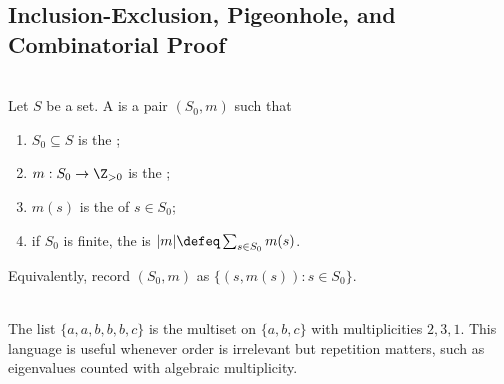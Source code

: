 \subsection{Inclusion-Exclusion, Pigeonhole, and Combinatorial Proof}

\begin{definition} \label{def:multisets-and-multiplicity} \\
Let $S$ be a set. A  is a pair $(S_0,m)$ such that
\begin{enumerate}[label=(\roman*)]
\setlength{\itemsep}{0pt}
\item $S_0\subseteq S$ is the ;
\item $m:S_0\to\Z_{>0}$ is the ;
\item $m(s)$ is the  of $s\in S_0$;
\item if $S_0$ is finite, the  is $\lvert m\rvert\defeq\sum_{s\in S_0}m(s)$.
\end{enumerate}
Equivalently, record $(S_0,m)$ as $\{(s,m(s)):s\in S_0\}$.
\end{definition}

\begin{example} \label{ex:multiset-eigenvalue-bookkeeping} \\
The list $\{a,a,b,b,b,c\}$ is the multiset on $\{a,b,c\}$ with multiplicities $2,3,1$.
This language is useful whenever order is irrelevant but repetition matters, such as eigenvalues counted with algebraic multiplicity.
\end{example}

